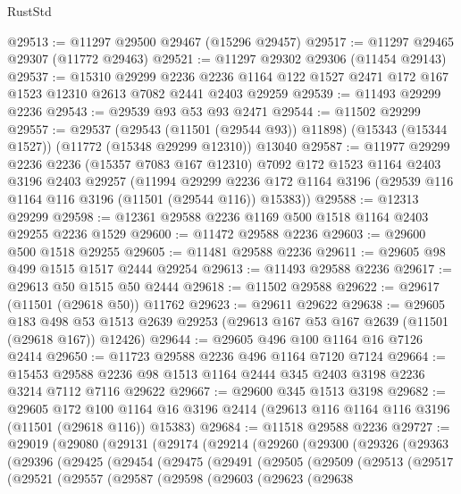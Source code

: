 \begin{lexlean}{RustStd}
\begin{coremodule}
@29513 := @11297 @29500 @29467 (@15296 @29457)
@29517 := @11297 @29465 @29307 (@11772 @29463)
@29521 := @11297 @29302 @29306 (@11454 @29143)
@29537 := @15310
    @29299
    @2236
    @2236
    @1164
    @122
    @1527
    @2471
    @172
    @167
    @1523
    @12310
    @2613
    @7082
    @2441
    @2403
    @29259
@29539 := @11493 @29299 @2236
@29543 := @29539 @93 @53 @93 @2471
@29544 := @11502 @29299
@29557 := @29537
    (@29543 (@11501 (@29544 @93)) @11898)
    (@15343 (@15344 @1527))
    (@11772 (@15348 @29299 @12310))
    @13040
@29587 := @11977
    @29299
    @2236
    @2236
    (@15357 @7083 @167 @12310)
    @7092
    @172
    @1523
    @1164
    @2403
    @3196
    @2403
    @29257
    (@11994
      @29299
      @2236
      @172
      @1164
      @3196
      (@29539 @116 @1164 @116 @3196 (@11501 (@29544 @116)) @15383))
@29588 := @12313 @29299
@29598 := @12361 @29588 @2236 @1169 @500 @1518 @1164 @2403 @29255 @2236 @1529
@29600 := @11472 @29588 @2236
@29603 := @29600 @500 @1518 @29255
@29605 := @11481 @29588 @2236
@29611 := @29605 @98 @499 @1515 @1517 @2444 @29254
@29613 := @11493 @29588 @2236
@29617 := @29613 @50 @1515 @50 @2444
@29618 := @11502 @29588
@29622 := @29617 (@11501 (@29618 @50)) @11762
@29623 := @29611 @29622
@29638 := @29605
    @183
    @498
    @53
    @1513
    @2639
    @29253
    (@29613 @167 @53 @167 @2639 (@11501 (@29618 @167)) @12426)
@29644 := @29605 @496 @100 @1164 @16 @7126 @2414
@29650 := @11723 @29588 @2236 @496 @1164 @7120 @7124
@29664 := @15453 @29588 @2236 @98 @1513 @1164 @2444 @345 @2403 @3198 @2236 @3214 @7112 @7116 @29622
@29667 := @29600 @345 @1513 @3198
@29682 := @29605
    @172
    @100
    @1164
    @16
    @3196
    @2414
    (@29613 @116 @1164 @116 @3196 (@11501 (@29618 @116)) @15383)
@29684 := @11518 @29588 @2236
@29727 := @29019
    (@29080
      (@29131
        (@29174
          (@29214
            (@29260
              (@29300
                (@29326
                  (@29363
                    (@29396
                      (@29425
                        (@29454
                          (@29475
                            (@29491
                              (@29505
                                (@29509
                                  (@29513
                                    (@29517
                                      (@29521
                                        (@29557
                                          (@29587
                                            (@29598
                                              (@29603
                                                (@29623
                                                  (@29638

\end{coremodule}
\end{lexlean}
